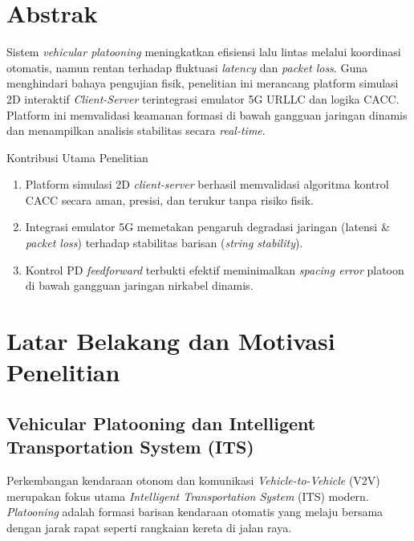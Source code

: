 \documentclass[12pt,a4paper]{article}
\begin{document}
\section{Abstrak}

Sistem \textit{vehicular platooning} meningkatkan efisiensi lalu lintas melalui koordinasi
otomatis, namun rentan terhadap fluktuasi \textit{latency} dan \textit{packet loss}.
Guna menghindari bahaya pengujian fisik, penelitian ini merancang platform simulasi 2D
interaktif \textit{Client-Server} terintegrasi emulator 5G URLLC dan logika CACC.
Platform ini memvalidasi keamanan formasi di bawah gangguan jaringan dinamis dan menampilkan
analisis stabilitas secara \textit{real-time}.

\begin{successbox}{Kontribusi Utama Penelitian}
\begin{enumerate}[noitemsep]
  \item Platform simulasi 2D \textit{client-server} berhasil memvalidasi algoritma kontrol
        CACC secara aman, presisi, dan terukur tanpa risiko fisik.
  \item Integrasi emulator 5G memetakan pengaruh degradasi jaringan (latensi \&
        \textit{packet loss}) terhadap stabilitas barisan (\textit{string stability}).
  \item Kontrol PD \textit{feedforward} terbukti efektif meminimalkan \textit{spacing error}
        platoon di bawah gangguan jaringan nirkabel dinamis.
\end{enumerate}
\end{successbox}

\section{Latar Belakang dan Motivasi Penelitian}

\subsection{Vehicular Platooning dan Intelligent Transportation System (ITS)}

Perkembangan kendaraan otonom dan komunikasi \textit{Vehicle-to-Vehicle} (V2V) merupakan
fokus utama \textit{Intelligent Transportation System} (ITS) modern. \textit{Platooning}
adalah formasi barisan kendaraan otomatis yang melaju bersama dengan jarak rapat seperti
rangkaian kereta di jalan raya.
\end{document}
